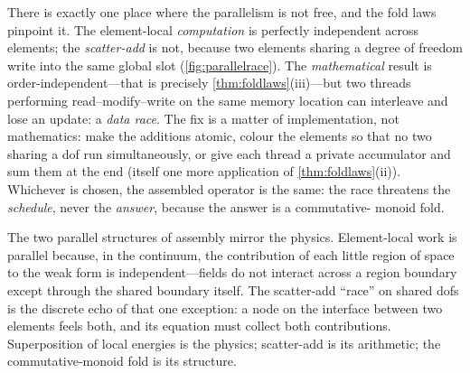 There is exactly one place where the parallelism is not free, and the fold laws
pinpoint it. The element-local \emph{computation} is perfectly independent across
elements; the \emph{scatter-add} is not, because two elements sharing a degree of
freedom write into the same global slot (\cref{fig:parallelrace}). The
\emph{mathematical} result is order-independent---that is precisely
\cref{thm:foldlaws}(iii)---but two threads performing
read--modify--write on the same memory location can interleave and lose an
update: a \emph{data race}. The fix is a matter of implementation, not
mathematics: make the additions atomic, colour the elements so that no two
sharing a dof run simultaneously, or give each thread a private accumulator and
sum them at the end (itself one more application of \cref{thm:foldlaws}(ii)).
Whichever is chosen, the assembled operator is the same: the race threatens the
\emph{schedule}, never the \emph{answer}, because the answer is a commutative-
monoid fold.

\begin{physicsbox}
The two parallel structures of assembly mirror the physics. Element-local work is
parallel because, in the continuum, the contribution of each little region of
space to the weak form is independent---fields do not interact across a region
boundary except through the shared boundary itself. The scatter-add ``race'' on
shared dofs is the discrete echo of that one exception: a node on the interface
between two elements feels both, and its equation must collect both
contributions. Superposition of local energies is the physics; scatter-add is its
arithmetic; the commutative-monoid fold is its structure.
\end{physicsbox}

